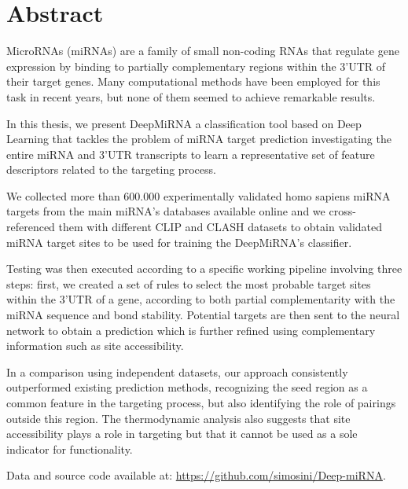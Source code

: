 \chapter*{Abstract}

MicroRNAs (miRNAs) are a family of small non-coding RNAs that regulate gene expression by binding to partially complementary regions within the 3’UTR of their target genes. Many computational methods have been employed for this task in recent years, but none of them seemed to achieve remarkable results.

In this thesis, we present DeepMiRNA a classification tool based on Deep Learning that  tackles the problem of miRNA target prediction investigating the entire miRNA and 3'UTR transcripts to learn a representative set of feature descriptors related to the targeting process. 

We collected more than 600.000 experimentally validated homo sapiens miRNA targets from the main miRNA's databases available online and we cross-referenced them with different CLIP and CLASH datasets to obtain validated miRNA target sites to be used for training the DeepMiRNA's classifier. 

Testing was then executed according to a specific working pipeline involving three steps: first, we created a set of rules to select the most probable target sites within the 3'UTR of a gene, according to both partial complementarity with the miRNA sequence and bond stability. Potential targets are then sent to the neural network to obtain a prediction which is further refined using complementary information such as site accessibility. 

In a comparison using independent datasets, our approach consistently outperformed existing prediction methods, recognizing the seed region as a common feature in the targeting process, but also identifying the role of pairings outside this region. The thermodynamic analysis also suggests that site accessibility plays a role in targeting but that it cannot be used as a sole indicator for functionality.

Data and source code available at: \url{https://github.com/simosini/Deep-miRNA}.